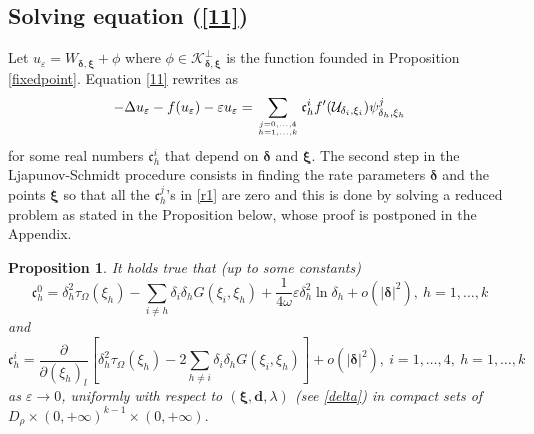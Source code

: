 \documentclass[11pt,a4paper]{amsart}
\newcommand{\e}{\varepsilon}
\renewcommand{\d }{\delta }
\newcommand{\Ui}{{\mathcal{U}_{\delta_i, \xi_i}}}
\newtheorem{proposition}[theorem]{Proposition}
\theoremstyle{definition}
\renewcommand{\(}{\left(}
\renewcommand{\)}{\right)}
\begin{document}
\subsection{Solving equation (\ref{11})}
Let $u_\e=W_{\pmb{\d}, \pmb{\xi}}+\phi$ where $\phi\in \mathcal K^\bot_{\pmb{\d}, \pmb{\xi}}$ is the function founded in 
Proposition \ref{fixedpoint}.   Equation \eqref{11} rewrites as
\begin{equation}\label{r1}
-\Delta u_\e -f(u_\e)-\e u_\e=\sum_{j=0, \ldots, 4\atop h=1, \ldots, k}\mathfrak c^i_h f'(\Ui)\psi^j_{\d_h, \xi_h}
\end{equation}
for some real numbers $\mathfrak c^i_h$ that depend on $\boldsymbol\delta$ and   $\boldsymbol \xi$. 
The second step  in the Ljapunov-Schmidt procedure
 consists in  finding  the rate parameters $\boldsymbol\delta$ and the points $\boldsymbol \xi$ so that all the $\mathfrak c^j_h$'s  in \eqref{r1} are zero and this is done by  solving a reduced problem as stated  in the Proposition below, whose proof is postponed in the Appendix.
\begin{proposition}\label{propro}
It holds true that (up to some constants)
$$\mathfrak c^0_h=\delta_h^2\tau_\Omega(\xi_h)-\sum_{i\neq h}\d_i\d_h G(\xi_i, \xi_h)+\frac{1}{4\omega}\e \d_h^2\ln\d_h+o(|\pmb\d|^2),\ h=1,\dots,k$$
and
$$\mathfrak c^i_h=\frac{\partial}{\partial(\xi_h)_l}\left[\d_h^2\tau_\Omega(\xi_h)-2\sum_{h\neq i}\d_i\d_hG(\xi_i,\xi_h)\right]+o(|\pmb\d|^2),\ i=1,\dots,4,\ h=1,\dots,k $$
as $\e \to 0$, uniformly  with respect to $(\boldsymbol\xi, \mathbf{d}, \lambda)$ (see \eqref{delta}) in compact sets of $D_\rho \times (0, +\infty)^{k-1}\times (0, +\infty).$
\end{proposition}
\end{document}
